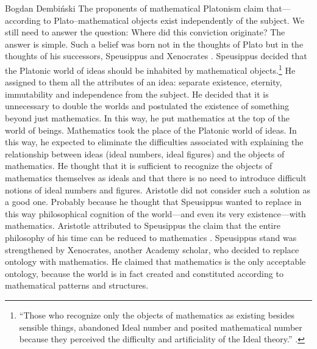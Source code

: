 \begin{artengenv}{Bogdan Dembiński}
The proponents of mathematical Platonism claim that---according to Plato–mathematical %
objects exist independently of the subject. We still need to answer the question: Where did this conviction  %
originate?%
 The answer is simple. Such a belief was born not in the thoughts of Plato but in the thoughts of his successors,
Speusippus and Xenocrates
\parencite[see][]{dembinski_pozny_2010,dillon_heirs_2003}.
Speusippus decided that the Platonic world of ideas should be inhabited by mathematical
objects.\footnote{``Those who recognize
only the objects of mathematics as existing besides sensible things, abandoned Ideal number and posited mathematical
number because they perceived the difficulty and artificiality of the Ideal theory.''
\parencite[\textit{Methaphysics}, 1086a]{aristotle_aristotles_1924}.
} He assigned to
them all the attributes of an idea: separate existence, eternity, immutability and independence from the subject. He
decided that it is unnecessary to double the worlds and postulated the existence of something beyond just mathematics.
In this way, he put mathematics at the top of the %
world of beings. Mathematics took the place of the Platonic world of ideas. In this way, he expected to eliminate the
difficulties associated with explaining the relationship between ideas (ideal numbers, ideal figures) and the objects
of mathematics. He thought that it is sufficient to recognize the objects of mathematics themselves as ideals and that
there is no need to introduce difficult notions of ideal numbers and figures. Aristotle did not consider such a
solution as a good one. Probably because he thought that Speusippus wanted to replace in this way philosophical
cognition of the world---and even its very existence---with mathematics. Aristotle attributed to Speusippus the
claim that the entire philosophy of his time can be reduced to mathematics
\parencite[\textit{Methaphysics}, 992a30]{aristotle_aristotles_1924}.
Speusippus stand was strengthened by Xenocrates, another Academy scholar, who decided to replace
ontology with mathematics. He claimed that mathematics is the only acceptable ontology, because the world is in fact
created and constituted according to mathematical patterns and structures.


\end{artengenv}
